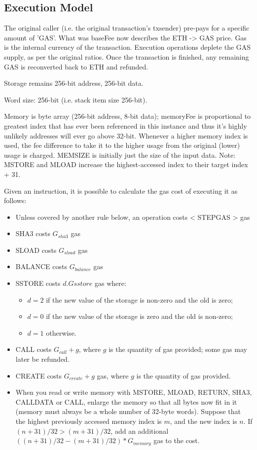 \documentclass[9pt,oneside]{amsart}
\begin{document}
\begin{multicols}{2}
\subsection{Execution Model} \label{ch:model}

The original caller (i.e. the original transaction's txsender) pre-pays for a specific amount of 'GAS'. What was baseFee now describes the ETH -> GAS price. Gas is the internal currency of the transaction. Execution operations deplete the GAS supply, as per the original ratios. Once the transaction is finished, any remaining GAS is reconverted back to ETH and refunded.

Storage remains 256-bit address, 256-bit data.

Word size: 256-bit (i.e. stack item size 256-bit).

Memory is byte array (256-bit address, 8-bit data); memoryFee is proportional to greatest index that has ever been referenced in this instance and thus it's highly unlikely addresses will ever go above 32-bit. Whenever a higher memory index is used, the fee difference to take it to the higher usage from the original (lower) usage is charged. MEMSIZE is initially just the size of the input data. Note: MSTORE and MLOAD increase the highest-accessed index to their target index + 31.


Given an instruction, it is possible to calculate the gas cost of executing it as follows:

\begin{itemize}
\item Unless covered by another rule below, an operation costs < STEPGAS > gas
\item SHA3 costs $G_{sha3}$ gas
\item SLOAD costs $G_{sload}$ gas
\item BALANCE costs $G_{balance}$ gas
\item SSTORE costs $d.G{sstore}$ gas where:
\begin{itemize}
\item $d = 2$ if the new value of the storage is non-zero and the old is zero;
\item $d = 0$ if the new value of the storage is zero and the old is non-zero;
\item $d = 1$ otherwise.
\end{itemize}
\item CALL costs $G_{call} + g$, where $g$ is the quantity of gas provided; some gas may later be refunded.
\item CREATE costs $G_{create} + g$ gas, where $g$ is the quantity of gas provided.
\item When you read or write memory with MSTORE, MLOAD, RETURN, SHA3, CALLDATA or CALL, enlarge the memory so that all bytes now fit in it (memory must always be a whole number of 32-byte words). Suppose that the highest previously accessed memory index is $m$, and the new index is $n$. If $(n + 31) / 32 > (m + 31) / 32$, add an additional $((n + 31) / 32 - (m + 31) / 32) * G_{memory}$ gas to the cost.
\end{itemize}


\end{multicols}
\end{document}
